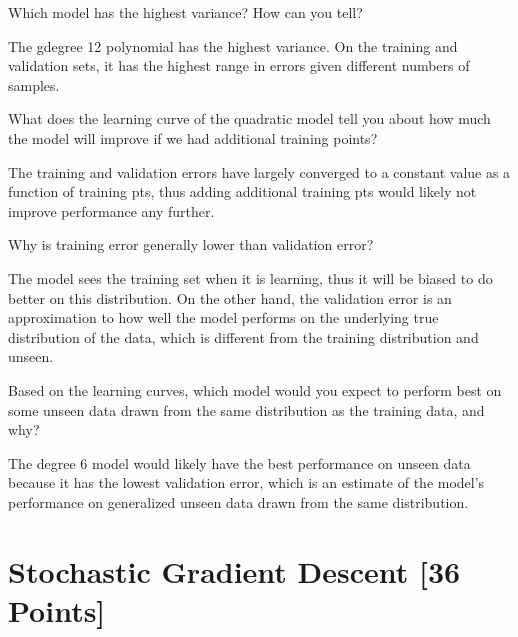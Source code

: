 \begin{problem}[3]
  Which model has the highest variance? How can you tell?
\end{problem}
\begin{solution}
  The gdegree 12 polynomial has the highest variance. On the training and validation sets, it has the highest range in errors given different numbers of samples.
\end{solution}

\begin{problem}[3]
  What does the learning curve of the quadratic model tell you about how much the model will improve if we had additional training points?
\end{problem}
\begin{solution}
  The training and validation errors have largely converged to a constant value as a function of training pts, thus adding additional training pts would likely not improve performance any further.
\end{solution}

\begin{problem}[3]
  Why is training error generally lower than validation error?
\end{problem}
\begin{solution}
  The model sees the training set when it is learning, thus it will be biased to do better on this distribution. On the other hand, the validation error is an approximation to how well the model performs on the underlying true distribution of the data, which is different from the training distribution and unseen.
\end{solution}

\begin{problem}[3]
  Based on the learning curves, which model would you expect to perform best on some unseen data drawn from the same distribution as the training data, and why?
\end{problem}
\begin{solution}
  The degree 6 model would likely have the best performance on unseen data because it has the lowest validation error, which is an estimate of the model's performance on generalized unseen data drawn from the same distribution.
\end{solution}





\newpage
\section{Stochastic Gradient Descent [36 Points]}

